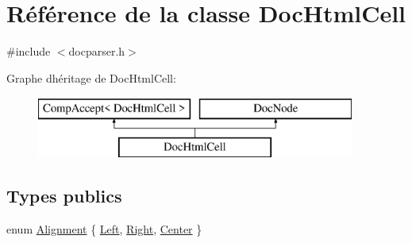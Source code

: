 \hypertarget{class_doc_html_cell}{}\section{Référence de la classe Doc\+Html\+Cell}
\label{class_doc_html_cell}


{\ttfamily \#include $<$docparser.\+h$>$}

Graphe d\textquotesingle{}héritage de Doc\+Html\+Cell\+:\begin{figure}[H]
\begin{center}
\leavevmode
\includegraphics[height=2.000000cm]{class_doc_html_cell}
\end{center}
\end{figure}
\subsection*{Types publics}
\begin{DoxyCompactItemize}
\item 
enum \hyperlink{class_doc_html_cell_a1bfba233eb785db3496ea2a82d9a2136}{Alignment} \{ \hyperlink{class_doc_html_cell_a1bfba233eb785db3496ea2a82d9a2136a8dd1ecd8df71ef42303c2b64fd73804f}{Left}, 
\hyperlink{class_doc_html_cell_a1bfba233eb785db3496ea2a82d9a2136a65214529ecca545b977a6edf61de84c4}{Right}, 
\hyperlink{class_doc_html_cell_a1bfba233eb785db3496ea2a82d9a2136a6bf57086c5c581a2d4905ad7cfbec3e0}{Center}
 \}
\end{DoxyCompactItemize}
